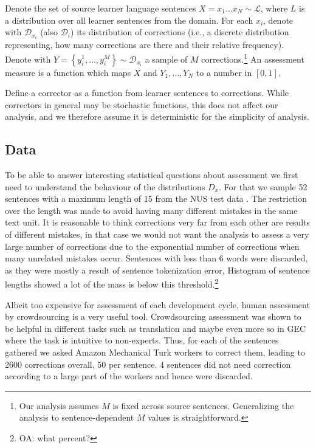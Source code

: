 \documentclass[english]{article}
\newcommand{\oa}[1]{\footnote{\color{red}OA: #1}}
\begin{document}
Denote the set of source learner language sentences $X=x_{1}\ldots x_N \sim \mathcal{L}$, where
$L$ is a distribution over all learner sentences from the domain. For each $x_i$, denote
with $\mathcal{D}_{x_i}$ (also $\mathcal{D}_i$) its distribution of corrections (i.e., a discrete
distribution representing, how many corrections are there and their relative frequency).
Denote with $Y = \left\{y_{i}^{1},\ldots, y_{i}^{M}\right\} \sim \mathcal{D}_{x_i}$
a sample of $M$ corrections.\footnote{Our analysis assumes $M$ is fixed across source sentences.
  Generalizing the analysis to sentence-dependent $M$ values is straightforward.}
An assessment measure is a function which maps $X$ and $Y_1,\ldots,Y_N$ to
a number in $[0,1]$.

Define a corrector as a function from learner sentences to corrections. While correctors
in general may be stochastic functions, this does not affect our analysis, and we therefore
assume it is deterministic for the simplicity of analysis.


\subsection{Data}

To be able to answer interesting statistical questions about assessment we first
need to understand the behaviour of the distributions $D_x$. For that we sample
52 sentences with a maximum length of 15 from the NUS test data
\cite{dahlmeier2013building}. The restriction over the length was made to avoid having many different mistakes in the same text unit. It is reasonable to think corrections very far from each other are results of different mistakes, in that case we would not want the analysis to assess a very large number of corrections due to the exponential number of corrections when many unrelated mistakes occur.
Sentences with less than 6 words were discarded, as they were
mostly a result of sentence tokenization error,
Histogram of sentence lengths showed a lot of the mass is below this threshold.\oa{what percent?}

Albeit too expensive for assessment of each development cycle, human assessment
by crowdsourcing is a very useful tool. Crowdsourcing assessment was shown to
be helpful in different tasks such as translation
\cite{zaidan2011crowdsourcing,post2012constructing,graham2015improved}
and maybe even more so in GEC \cite{madnani2011they} where the task is intuitive to non-experts.
Thus, for each of the sentences gathered we asked Amazon Mechanical Turk workers to correct them, leading to 2600 corrections overall,
50 per sentence. 4 sentences did not need correction according to a large part of the workers and hence were discarded.
\end{document}

